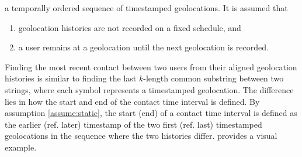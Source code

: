 a temporally ordered sequence of timestamped geolocations. It is assumed that
\begin{enumerate}
  \item geolocation histories are not recorded on a fixed schedule, and \label{assume:sched}
  \item a user remains at a geolocation until the next geolocation is recorded. \label{assume:static}
\end{enumerate}

Finding the most recent contact between two users from their aligned geolocation histories is similar to finding the last $k$-length common substring between two strings, where each symbol represents a timestamped geolocation. The difference lies in how the start and end of the contact time interval is defined. By assumption \ref{assume:static}, the start (end) of a contact time interval is defined as the earlier (ref. later) timestamp of the two first (ref. last) timestamped geolocations in the sequence where the two histories differ.  provides a visual example.


